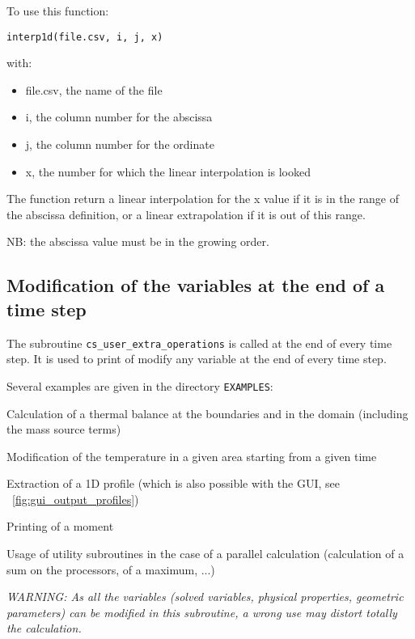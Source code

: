 {{{To use this function:

\texttt{interp1d(file.csv, i, j, x)}

with:
\begin{itemize}
\item file.csv, the name of the file
\item i, the column number for the abscissa
\item j, the column number for the ordinate
\item x, the number for which the linear interpolation is looked
\end{itemize}
The function return a linear interpolation for the x value
if it is in the range of the abscissa definition, or a
linear extrapolation if it is out of this range.

NB: the abscissa value must be in the growing order.

\subsection{Modification of the variables at the end of a time step}

The subroutine \texttt{cs\_user\_extra\_operations} is called at the end
of every time step. It is used to print of modify any variable at the end
of every time step.

Several examples are given in the directory \texttt{EXAMPLES}:
\begin{list}{-}{}
\item Calculation of a thermal balance at  the boundaries and in the
      domain (including the mass source terms)

\item Modification of the temperature in a given area starting from a
      given time

\item Extraction of a 1D profile (which is also possible with the GUI,
see \figurename~\ref{fig:gui_output_profiles})

\item Printing of a moment

\item Usage of utility
      subroutines in the case of a parallel calculation
      (calculation of a sum on the processors, of a maximum, ...)
\end{list}

{\em WARNING: As all the variables (solved variables, physical
properties, geometric parameters) can be modified in this subroutine, a
wrong use may distort totally the calculation.}

}}}
